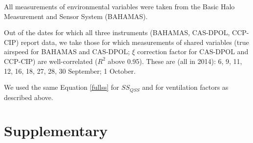 \documentclass{article}
\begin{document}
All measurements of environmental variables were taken from the Basic Halo Measurement and Sensor System (BAHAMAS).

Out of the dates for which all three instruments (BAHAMAS, CAS-DPOL, CCP-CIP) report data, we take those for which measurements of shared variables (true airspeed for BAHAMAS and CAS-DPOL; $\xi$ correction factor for CAS-DPOL and CCP-CIP) are well-correlated ($R^2$ above 0.95). These are (all in 2014): 6, 9, 11, 12, 16, 18, 27, 28, 30 September; 1 October.

We used the same Equation \ref{fullss} for $SS_{QSS}$ and for ventilation factors as described above.

\clearpage
\newpage

\section{Supplementary}
\end{document}
